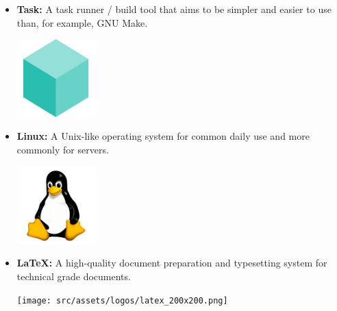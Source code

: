 \begin{itemize}
    \item \textbf{Task:} \newline A task runner / build tool that aims to be simpler and easier to use than, for example, GNU Make. \newline \newline
          \begin{minipage}{\linewidth}
              \centering
              \includegraphics[width=3cm]{src/assets/logos/task_500x500.png}
          \end{minipage}
    \item \textbf{Linux:} \newline A Unix-like operating system for common daily use and more commonly for servers. \newline
          \begin{minipage}{\linewidth}
              \centering
              \includegraphics[width=3cm]{src/assets/logos/linux_512x512.png}
          \end{minipage}
    \item \textbf{LaTeX:} \newline \cite{latex-project} A high-quality document preparation and typesetting system for technical grade documents. \newline \newline
          \begin{minipage}{\linewidth}
              \centering
              \texttt{[image: src/assets/logos/latex\_200x200.png]}
          \end{minipage}
          \newpage

\end{itemize}

